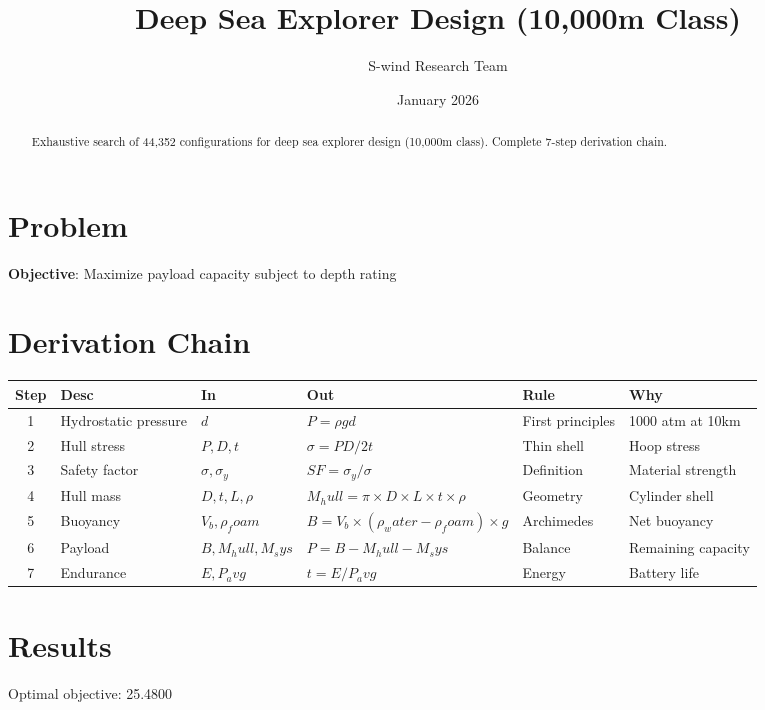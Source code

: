 \documentclass[11pt]{article}
\title{Deep Sea Explorer Design (10,000m Class)}
\author{S-wind Research Team}
\date{January 2026}
\begin{document}
\maketitle

\begin{abstract}
Exhaustive search of 44,352 configurations for deep sea explorer design (10,000m class). Complete 7-step derivation chain.
\end{abstract}

\section{Problem}
\textbf{Objective}: Maximize payload capacity subject to depth rating

\section{Derivation Chain}
\begin{longtable}{|c|p{2cm}|p{2cm}|p{3cm}|p{2cm}|p{3cm}|}
\hline
Step & Desc & In & Out & Rule & Why\\\hline\endhead
1 & Hydrostatic pressure & $d$ & $P = ρgd$ & First principles & 1000 atm at 10km\\\hline
2 & Hull stress & $P, D, t$ & $σ = PD/2t$ & Thin shell & Hoop stress\\\hline
3 & Safety factor & $σ, σ_y$ & $SF = σ_y/σ$ & Definition & Material strength\\\hline
4 & Hull mass & $D, t, L, ρ$ & $M_hull = π×D×L×t×ρ$ & Geometry & Cylinder shell\\\hline
5 & Buoyancy & $V_b, ρ_foam$ & $B = V_b × (ρ_water - ρ_foam) × g$ & Archimedes & Net buoyancy\\\hline
6 & Payload & $B, M_hull, M_sys$ & $P = B - M_hull - M_sys$ & Balance & Remaining capacity\\\hline
7 & Endurance & $E, P_avg$ & $t = E / P_avg$ & Energy & Battery life\\\hline
\end{longtable}

\section{Results}
Optimal objective: 25.4800
\end{document}

